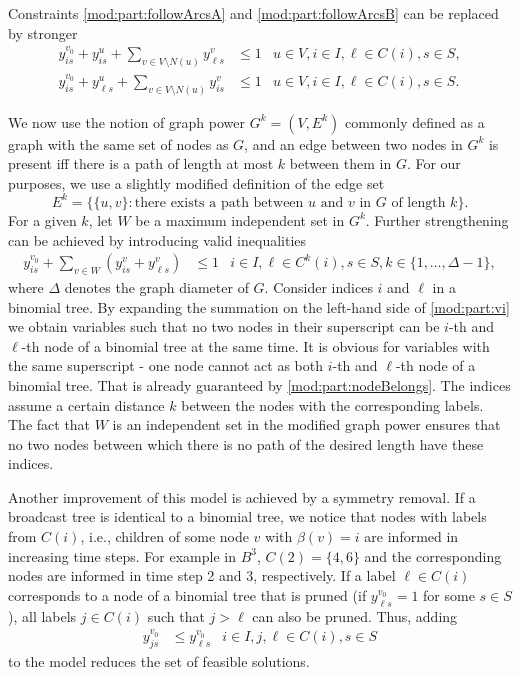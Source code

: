 Constraints \eqref{mod:part:followArcsA} and \eqref{mod:part:followArcsB} can be replaced by stronger
\begin{subequations}
\begin{align}
\label{mod:part:followArcsAStrongerA}
y^{v_0}_{is}+y^u_{i s} + \sum\limits_{v\in V\setminus N(u)}y^v_{\ell s}&\leq 1 & u\in V,i\in I,\ell\in C(i), s\in S,  \\
\label{mod:part:followArcsAStrongerB}
y^{v_0}_{is}+y^u_{\ell s} + \sum\limits_{v\in V\setminus N(u)}y^v_{i s}&\leq 1 & u\in V,i\in I,\ell\in C(i), s\in S. 
\end{align}
\end{subequations}

We now use the notion of graph power $G^k=(V,E^k)$ commonly defined as a graph with the same set of nodes as $G$,
and an edge between two nodes in $G^k$ is present iff there is a path of length at most $k$ between them in $G$.
For our purposes, we use a slightly modified definition of the edge set
$$E^k=\{\{u,v\}:\text{there exists a path between $u$ and $v$ in $G$ of length $k$}\}.$$
For a given $k$, let $W$ be a maximum independent set in $G^k$.
Further strengthening can be achieved by introducing valid inequalities
\begin{subequations}
\begin{align}
\label{mod:part:vi}
y^{v_0}_{is}+ \sum\limits_{v\in W}(y^v_{is}+y^v_{\ell s})&\leq 1 & i\in I,\ell\in C^k(i), s\in S,k\in\{1,\dots,\Delta-1\}, 
\end{align}
\end{subequations}
where $\Delta$ denotes the graph diameter of $G$.
Consider indices $i$ and $\ell$ in a binomial tree.
By expanding the summation on the left-hand side of \eqref{mod:part:vi}
we obtain variables such that no two nodes in their superscript can be $i$-th and $\ell$-th node of a binomial tree at the same time.
It is obvious for variables with the same superscript - one node cannot act as both $i$-th and $\ell$-th node of a binomial tree.
That is already guaranteed by \eqref{mod:part:nodeBelongs}.
The indices assume a certain distance $k$ between the nodes with the corresponding labels.
The fact that $W$ is an independent set in the modified graph power ensures that no two nodes between which there is no path of the desired length have these indices.

Another improvement of this model is achieved by a symmetry removal.
If a broadcast tree is identical to a binomial tree, we notice that nodes with labels from $C(i)$, i.e., children of some node $v$ with $\beta(v)=i$ are informed in increasing time steps.
For example in $B^3$, $C(2)=\{4,6\}$ and the corresponding nodes are informed in time step 2 and 3, respectively.
If a label $\ell\in C(i)$ corresponds to a node of a binomial tree that is pruned (if $y^{v_0}_{\ell s}=1$ for some $s\in S$), 
all labels $j\in C(i)$ such that $j>\ell$ can also be pruned. 
Thus, adding 
\begin{subequations}
\begin{align}
\label{mod:part:sr}
y^{v_0}_{js}&\leq y^{v_0}_{\ell s}&i\in I,j,\ell\in C(i), s\in S
\end{align}
\end{subequations}
to the model reduces the set of feasible solutions.

